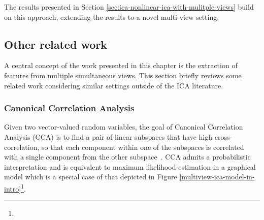 The results presented in Section \ref{sec:ica-nonlinear-ica-with-mulitple-views} build on this approach, extending the results to a novel multi-view setting.


%


\subsection{Other related work}\label{sec:related-work}
A central concept of the work presented in this chapter is the extraction of features from multiple simultaneous views. 
This section briefly reviews some related work considering similar settings outside of the ICA literature.
\subsubsection{Canonical Correlation Analysis}
\label{sec:probacca}
Given two vector-valued random variables, the goal of Canonical Correlation Analysis (CCA) is to find a pair of linear subspaces that have high cross-correlation, so that each component within one of the subspaces is correlated with a single component from the other subspace~\citep{hotelling1992relations, bishop2006pattern}.
CCA admits a probabilistic interpretation \citep{bach2005probabilistic} and is equivalent to maximum likelihood estimation in a graphical model which is a special case of that depicted in Figure 
\ref{multiview-ica-model-in-intro}\footnote{}.

